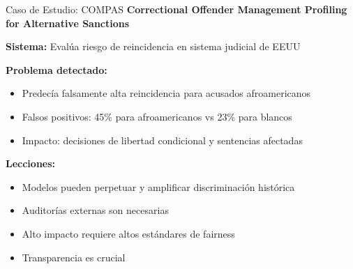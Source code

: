 \documentclass[aspectratio=169]{beamer}
\begin{document}
\begin{frame}{Caso de Estudio: COMPAS}
\textbf{Correctional Offender Management Profiling for Alternative Sanctions}

\vspace{0.3cm}

\textbf{Sistema:} Evalúa riesgo de reincidencia en sistema judicial de EEUU

\vspace{0.3cm}

\textbf{Problema detectado:}
\begin{itemize}
\item Predecía falsamente alta reincidencia para acusados afroamericanos
\item Falsos positivos: 45\% para afroamericanos vs 23\% para blancos
\item Impacto: decisiones de libertad condicional y sentencias afectadas
\end{itemize}

\vspace{0.3cm}

\textbf{Lecciones:}
\begin{itemize}
\item Modelos pueden perpetuar y amplificar discriminación histórica
\item Auditorías externas son necesarias
\item Alto impacto requiere altos estándares de fairness
\item Transparencia es crucial
\end{itemize}
\end{frame}
\end{document}

